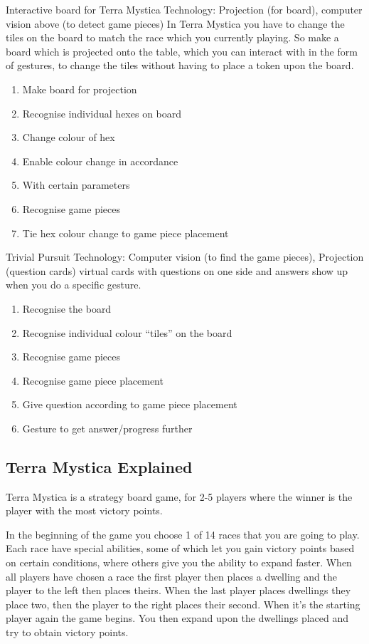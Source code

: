 Interactive board for Terra Mystica
Technology: Projection (for board), computer vision above (to detect game pieces)
In Terra Mystica you have to change the tiles on the board to match the race which you currently playing. So make a board which is projected onto the table, which you can interact with in the form of gestures, to change the tiles without having to place a token upon the board.
\begin{enumerate}
\item Make board for projection
\item Recognise individual hexes on board
\item Change colour of hex
\item Enable colour change in accordance \item With certain parameters
\item Recognise game pieces
\item Tie hex colour change to game piece placement
\end{enumerate} 


Trivial Pursuit 
Technology: Computer vision (to find the game pieces), Projection (question cards)
virtual cards with questions on one side and answers show up when you do a specific gesture.
\begin{enumerate}
\item Recognise the board
\item Recognise individual colour “tiles” on the board
\item Recognise game pieces
\item Recognise game piece placement 
\item Give question according to game piece placement
\item Gesture to get answer/progress further
\end{enumerate}



\subsection{Terra Mystica Explained}

Terra Mystica is a strategy board game, for 2-5 players where the winner is the player with the most victory points. 

In the beginning of the game you choose 1 of 14 races that you are going to play. Each race have special abilities, some of which let you gain victory points based on certain conditions, where others give you the ability to expand faster. When all players have chosen a race the first player then places a dwelling and the player to the left then places theirs. When the last player places dwellings they place two, then the player to the right places their second. When it's the starting player again the game begins. You then expand upon the dwellings placed and try to obtain victory points.

